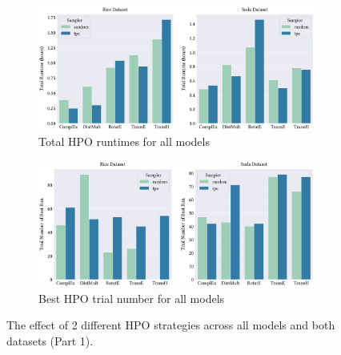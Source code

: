 \begin{figure}[!ht]
    \centering
    \begin{subfigure}[b]{\textwidth}
        \centering
        \includegraphics[width=1\textwidth]{figures/hpo_total_runtime.eps}
        \caption{Total \ac{HPO} runtimes for all models}
        \label{subfig:hpo_total_runtime}
    \end{subfigure}
    
    \begin{subfigure}[b]{\textwidth}
        \centering
        \includegraphics[width=1\textwidth]{figures/hpo_best_trial_number.eps}
        \caption{Best \ac{HPO} trial number for all models}
        \label{subfig:hpo_best_trial_number}
    \end{subfigure}
    
    \caption{The effect of 2 different \ac{HPO} strategies across all models and both datasets (Part 1).}
    \label{fig:effect_of_2_different_HPO_strategies_part1}
\end{figure}


